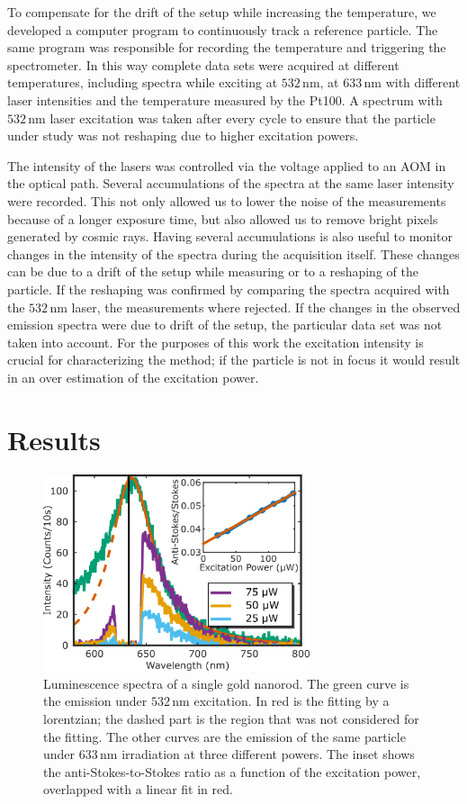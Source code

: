 \documentclass[journal=nalefd,manuscript=letter]{achemso}
\newcommand{\nm}{\ensuremath{\,\textrm{nm}}}
\begin{document}
To compensate for the drift of the setup while increasing the temperature, we
developed a computer program to continuously track a reference particle. The
same program was responsible for recording the temperature and triggering the
spectrometer. In this way complete data sets were acquired at different
temperatures, including spectra while exciting at $532\nm$, at $633\nm$ with
different laser intensities and the temperature measured by the Pt100. A
spectrum with $532\nm$ laser excitation was taken after every cycle to ensure
that the particle under study was not reshaping due to higher excitation powers.

The intensity of the lasers was controlled via the voltage applied to an AOM in
the optical path. Several accumulations of the spectra at the same laser
intensity were recorded. This not only allowed us to lower the noise of the
measurements because of a longer exposure time, but also allowed us to remove
bright pixels generated by cosmic rays. Having several accumulations is also
useful to monitor changes in the intensity of the spectra during the acquisition
itself. These changes can be due to a drift of the setup while measuring or to a
reshaping of the particle. If the reshaping was confirmed by comparing the
spectra acquired with the $532\nm$ laser\cite{Liu2009}, the measurements where
rejected. If the changes in the observed emission spectra were due to drift of
the setup, the particular data set was not taken into account. For the purposes
of this work the excitation intensity is crucial for characterizing the method;
if the particle is not in focus it would result in an over estimation of the
excitation power.


\section{Results}
\begin{figure}[tp] \centering
\includegraphics[width=78.4mm]{Figures/02_Several_Intensities/02_several_intensities.png}
\caption{Luminescence spectra of a single gold nanorod. The green curve is the
emission under $532\nm$ excitation. In red is the fitting by a lorentzian; the
dashed part is the region that was not considered for the fitting. The other
curves are the emission of the same particle under $633\nm$ irradiation at three 
different powers. The inset shows the anti-Stokes-to-Stokes ratio as a function
of the excitation power, overlapped with a linear fit in red.}
	\label{fig:spectra_intensity}
\end{figure}
\end{document}
